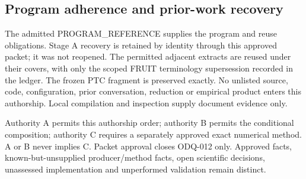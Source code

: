 {{\subsection*{Program adherence and prior-work recovery}
The admitted PROGRAM\_REFERENCE supplies the program and reuse obligations.
Stage A recovery is retained by identity through this approved packet; it was
not reopened. The permitted adjacent extracts are reused under their covers,
with only the scoped FRUIT terminology supersession recorded in the ledger.
The frozen PTC fragment is preserved exactly. No unlisted source, code,
configuration, prior conversation, reduction or empirical product enters
this authorship. Local compilation and inspection supply document evidence only.

Authority A permits this authorship order; authority B permits the conditional
composition; authority C requires a separately approved exact numerical method.
A or B never implies C. Packet approval closes ODQ-012 only. Approved facts,
known-but-unsupplied producer/method facts, open scientific decisions,
unassessed implementation and unperformed validation remain distinct.
}}
